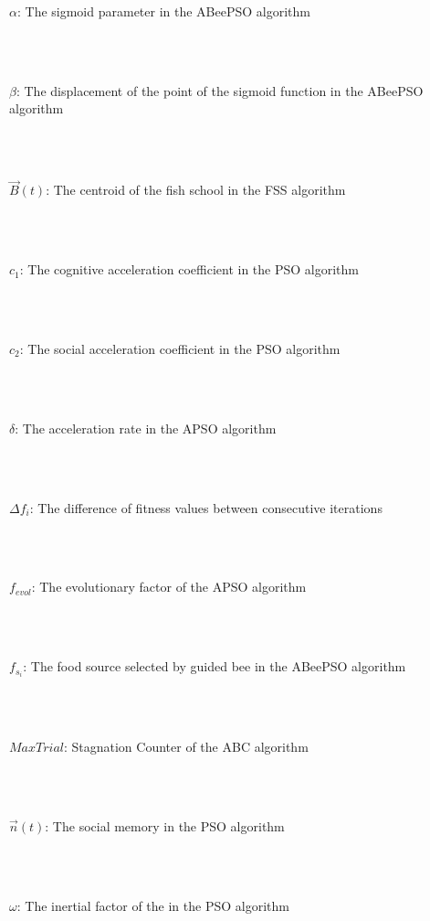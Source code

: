 \begin{tabbing}
\parbox{5in}{$\alpha$: The sigmoid parameter in the ABeePSO algorithm\dotfill \pageref{eq:ABeePSO_Step}}\\
\\
\parbox{5in}{$\beta$: The displacement of the point of the sigmoid function in the ABeePSO algorithm\dotfill \pageref{eq:ABeePSO_Step}}\\
\\
\parbox{5in}{$\vec B(t)$: The centroid of the fish school in the FSS algorithm\dotfill \pageref{eq:FSS_centroid}}\\
\\
\parbox{5in}{$c_1$: The cognitive acceleration coefficient in the PSO algorithm\dotfill \pageref{eq:PSO_velocity}}\\
\\
\parbox{5in}{$c_2$: The social acceleration coefficient in the PSO algorithm\dotfill \pageref{eq:PSO_velocity}}\\
\\
\parbox{5in}{$\delta$: The acceleration rate in the APSO algorithm\dotfill \pageref{eq:APSO_normalized}}\\
\\
\parbox{5in}{$\Delta f_i$: The difference of fitness values between consecutive iterations\dotfill \pageref{eq:FSS_feed}}\\
\\
\parbox{5in}{$f_{evol}$: The evolutionary factor of the APSO algorithm\dotfill \pageref{eq:APSO_factor}}\\
\\
\parbox{5in}{$f_{s_i}$: The food source selected by guided bee in the ABeePSO algorithm\dotfill \pageref{eq:ABeePSO_Guided}}\\
\\
\parbox{5in}{$MaxTrial$: Stagnation Counter of the ABC algorithm\dotfill \pageref{eq:ABC_scout}}\\
\\
\parbox{5in}{$\vec n(t)$: The social memory in the PSO algorithm\dotfill \pageref{eq:PSO_velocity}}\\
\\
\parbox{5in}{$\omega$: The inertial factor of the in the PSO algorithm\dotfill \pageref{eq:PSO_inertial}}\\
\\

\end{tabbing}
